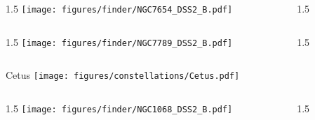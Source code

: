\documentclass[final]{beamer}
\newlength{\colwidth}
\begin{document}

\begin{frame}[t]{}
    \begin{columns}[T]
        \begin{column}{1.5\colwidth}
            \centering
            \texttt{[image: figures/finder/NGC7654\_DSS2\_B.pdf]}
        \end{column}
        \begin{column}{1.5\colwidth}
            \Large
            
        \end{column}
    \end{columns}
    \vspace{\fill}
    \begin{columns}[T]
        \begin{column}{1.5\colwidth}
            \centering
            \texttt{[image: figures/finder/NGC7789\_DSS2\_B.pdf]}
        \end{column}
        \begin{column}{1.5\colwidth}
            \Large
            
        \end{column}
    \end{columns}
\end{frame}


\begin{frame}[t]{\LARGE Cetus}
    \centering
    \texttt{[image: figures/constellations/Cetus.pdf]}
\end{frame}


\begin{frame}[t]{}
    \begin{columns}[T]
        \begin{column}{1.5\colwidth}
            \centering
            \texttt{[image: figures/finder/NGC1068\_DSS2\_B.pdf]}
        \end{column}
        \begin{column}{1.5\colwidth}
            \Large
            
        \end{column}
    \end{columns}
    \vspace{\fill}
\end{frame}
\end{document}
